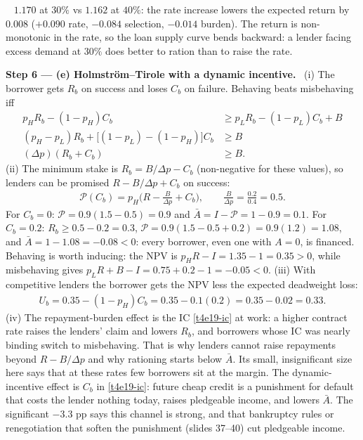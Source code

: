 \documentclass[11pt,a4paper]{article}
\newcommand{\step}[2]{\par\medskip\noindent\textbf{Step #1 --- #2.}~}
\newcommand{\answer}[1]{\par\smallskip\noindent\fbox{\textbf{Answer #1.}}~}
\begin{document}
\answer{(d)} $1.170$ at $30\%$ vs $1.162$ at $40\%$: the rate increase lowers the expected return by $0.008$
($+0.090$ rate, $-0.084$ selection, $-0.014$ burden). The return is non-monotonic in the rate, so the loan supply
curve bends backward: a lender facing excess demand at $30\%$ does better to ration than to raise the rate.

\step{6}{(e) Holmström--Tirole with a dynamic incentive} (i) The borrower gets $R_b$ on success and loses $C_b$ on
failure. Behaving beats misbehaving iff
\begin{align}
  p_HR_b-(1-p_H)C_b &\ge p_LR_b-(1-p_L)C_b+B \nonumber\\
  (p_H-p_L)R_b+\big[(1-p_L)-(1-p_H)\big]C_b &\ge B \nonumber\\
  (\Delta p)(R_b+C_b) &\ge B. \label{t4e19-ic}
\end{align}
(ii) The minimum stake is $R_b=B/\Delta p-C_b$ (non-negative for these values), so lenders can be promised
$R-B/\Delta p+C_b$ on success:
\begin{align}
  \mathcal P(C_b) = p_H\Big(R-\frac{B}{\Delta p}+C_b\Big),\qquad \frac{B}{\Delta p}=\frac{0.2}{0.4}=0.5. \nonumber
\end{align}
For $C_b=0$: $\mathcal P=0.9(1.5-0.5)=0.9$ and $\bar A=I-\mathcal P=1-0.9=0.1$. For $C_b=0.2$: $R_b\ge0.5-0.2=0.3$,
$\mathcal P=0.9(1.5-0.5+0.2)=0.9(1.2)=1.08$, and $\bar A=1-1.08=-0.08<0$: every borrower, even one with $A=0$, is
financed. Behaving is worth inducing: the NPV is $p_HR-I=1.35-1=0.35>0$, while misbehaving gives $p_LR+B-I=0.75+0.2-1=-0.05<0$.
(iii) With competitive lenders the borrower gets the NPV less the expected deadweight loss:
\begin{align}
  U_b = 0.35-(1-p_H)C_b = 0.35-0.1(0.2) = 0.35-0.02 = 0.33. \nonumber
\end{align}
(iv) The repayment-burden effect is the IC \eqref{t4e19-ic} at work: a higher contract rate raises the lenders'
claim and lowers $R_b$, and borrowers whose IC was nearly binding switch to misbehaving. That is why lenders cannot
raise repayments beyond $R-B/\Delta p$ and why rationing starts below $\bar A$. Its small, insignificant size here
says that at these rates few borrowers sit at the margin. The dynamic-incentive effect is $C_b$ in \eqref{t4e19-ic}:
future cheap credit is a punishment for default that costs the lender nothing today, raises pledgeable income, and
lowers $\bar A$. The significant $-3.3$ pp says this channel is strong, and that bankruptcy rules or renegotiation
that soften the punishment (slides 37--40) cut pledgeable income.
\end{document}
